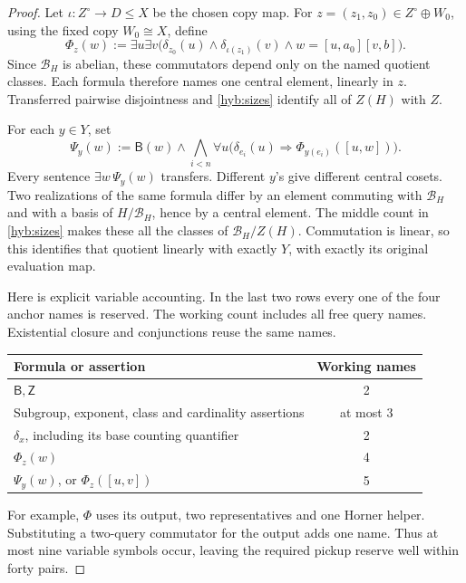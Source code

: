 \documentclass[11pt]{article}
\theoremstyle{definition}
\theoremstyle{remark}
\numberwithin{equation}{section}
\begin{document}
\begin{proof}
Let \(\iota:Z^\circ\to D\leq X\) be the chosen copy map.
For \(z=(z_1,z_0)\in Z^\circ\oplus W_0\), using the fixed copy
\(W_0\cong X\), define
\begin{equation}
 \Phi_z(w):=\exists u\exists v\bigl(
   \delta_{z_0}(u)\land\delta_{\iota(z_1)}(v)
   \land w=[u,a_0][v,b]\bigr).
 \label{hyb:central-name}
\end{equation}
Since \(\mathcal B_H\) is abelian, these commutators depend only on
the named quotient classes.  Each formula therefore names one central
element, linearly in \(z\).  Transferred pairwise disjointness and
\eqref{hyb:sizes} identify all of \(Z(H)\) with \(Z\).

For each \(y\in Y\), set
\begin{equation}
 \Psi_y(w):=\mathsf B(w)\land
 \bigwedge_{i<n}\forall u\bigl(
     \delta_{e_i}(u)\Longrightarrow
     \Phi_{y(e_i)}([u,w])\bigr).
 \label{hyb:matrix-name}
\end{equation}
Every sentence \(\exists w\,\Psi_y(w)\) transfers.  Different
\(y\)'s give different central cosets.  Two realizations of the same
formula differ by an element commuting with \(\mathcal B_H\) and
with a basis of \(H/\mathcal B_H\), hence by a central element.
The middle count in \eqref{hyb:sizes} makes these all the classes of
\(\mathcal B_H/Z(H)\).  Commutation is linear, so this identifies
that quotient linearly with exactly \(Y\), with exactly
its original evaluation map.

Here is explicit variable accounting.  In the last two rows every
one of the four anchor names is reserved. The working count includes
all free query names.  Existential closure and conjunctions reuse the
same names.
\begin{center}
\begin{tabular}{lc}
\hline
Formula or assertion & Working names \\
\hline
\(\mathsf B,\mathsf Z\) & 2 \\
Subgroup, exponent, class and cardinality assertions & at most 3 \\
\(\delta_x\), including its base counting quantifier & 2 \\
\(\Phi_z(w)\) & 4 \\
\(\Psi_y(w)\), or \(\Phi_z([u,v])\) & 5 \\
\hline
\end{tabular}
\end{center}
For example, \(\Phi\) uses its output, two representatives and one
Horner helper. Substituting a two-query commutator for the output adds
one name.  Thus at most nine variable symbols occur, leaving the
required pickup reserve well within forty pairs.



\end{proof}
\end{document}
